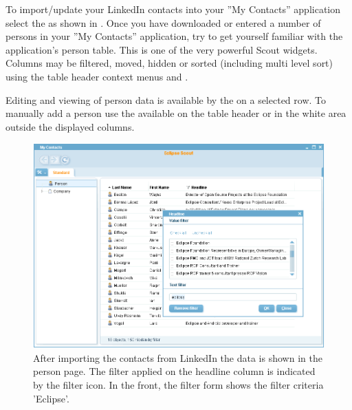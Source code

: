 \documentclass[a4paper,10pt,twoside]{book}
\begin{document}
To import/update your LinkedIn contacts into your ''My Contacts'' application select the  as shown in .
Once you have downloaded or entered a number of persons in your ''My Contacts'' application, try to get yourself familiar with the application's person table. 
This is one of the very powerful Scout widgets. 
Columns may be filtered, moved, hidden or sorted (including multi level sort) using the table header context menus   and .

Editing and viewing of person data is available by the  on a selected row.
To manually add a person use the  available on the table header or in the white area outside the displayed columns. 

\begin{figure}
\includegraphics[width=14cm]{my_contacts_rayo_filteredcontacts.png} 
\caption{After importing the contacts from LinkedIn the data is shown in the person page. 
The filter applied on the headline column is indicated by the filter icon. In the front, the filter form shows the filter criteria 'Eclipse'.}
\end{figure}
\end{document}
